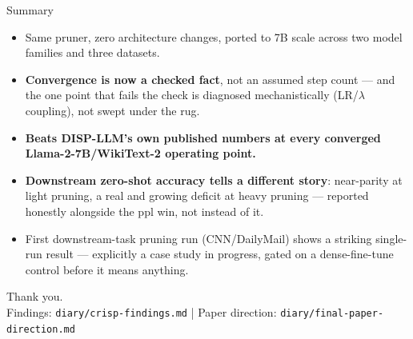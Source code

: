 \documentclass[10pt,aspectratio=169]{beamer}
\begin{document}
\begin{frame}{Summary}
  \begin{itemize}
    \item Same pruner, zero architecture changes, ported to 7B scale across two model families and three datasets.
    \item \textbf{Convergence is now a checked fact}, not an assumed step count --- and the one point that fails the check is diagnosed mechanistically (LR/$\lambda$ coupling), not swept under the rug.
    \item \textbf{Beats DISP-LLM's own published numbers at every converged Llama-2-7B/WikiText-2 operating point.}
    \item \textbf{Downstream zero-shot accuracy tells a different story}: near-parity at light pruning, a real and growing deficit at heavy pruning --- reported honestly alongside the ppl win, not instead of it.
    \item First downstream-task pruning run (CNN/DailyMail) shows a striking single-run result --- explicitly a case study in progress, gated on a dense-fine-tune control before it means anything.
  \end{itemize}
\end{frame}

\begin{frame}[standout]
  Thank you.\\[0.6em]
  {\normalsize\normalfont Findings: \texttt{diary/crisp-findings.md} \;|\; Paper direction: \texttt{diary/final-paper-direction.md}}
\end{frame}
\end{document}
